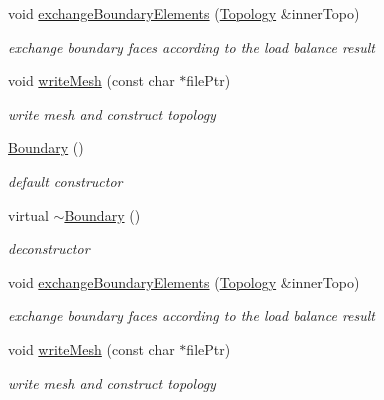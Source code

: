 \begin{DoxyCompactItemize}
void \hyperlink{classHSF_1_1Boundary_a247677270031ff60c915e7afb1a1de51}{exchangeBoundaryElements} (\hyperlink{classHSF_1_1Topology}{Topology} \&innerTopo)
\begin{DoxyCompactList}\small\item\em exchange boundary faces according to the load balance result \item\end{DoxyCompactList}\item 
void \hyperlink{classHSF_1_1Boundary_aa9891dd719196ca7307e0327d1eaf39f}{writeMesh} (const char $\ast$filePtr)
\begin{DoxyCompactList}\small\item\em write mesh and construct topology \item\end{DoxyCompactList}\item 
\hyperlink{classHSF_1_1Boundary_a66741eb92598adf5e34a07568a0a8778}{Boundary} ()
\begin{DoxyCompactList}\small\item\em default constructor \item\end{DoxyCompactList}\item 
virtual \hyperlink{classHSF_1_1Boundary_a8249905be447e99edf81401f17093f5e}{$\sim$Boundary} ()
\begin{DoxyCompactList}\small\item\em deconstructor \item\end{DoxyCompactList}\item 
void \hyperlink{classHSF_1_1Boundary_a247677270031ff60c915e7afb1a1de51}{exchangeBoundaryElements} (\hyperlink{classHSF_1_1Topology}{Topology} \&innerTopo)
\begin{DoxyCompactList}\small\item\em exchange boundary faces according to the load balance result \item\end{DoxyCompactList}\item 
void \hyperlink{classHSF_1_1Boundary_aa9891dd719196ca7307e0327d1eaf39f}{writeMesh} (const char $\ast$filePtr)
\begin{DoxyCompactList}\small\item\em write mesh and construct topology \item\end{DoxyCompactList}\end{DoxyCompactItemize}


